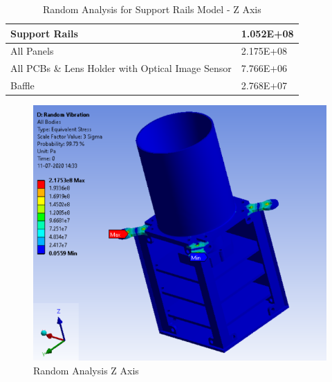 \documentclass[../../main.tex]{subfiles}
\begin{document}
\begin{enumerate}
\begin{enumerate}
\begin{enumerate}
\begin{itemize}
\begin{table}[h!]
\begin{tabular}{|p{8cm}|p{5cm}|}
                        Support Rails & 1.052E+08 \\
                        \hline
                        All Panels & 2.175E+08 \\
                        \hline
                        All PCBs \& Lens Holder with Optical Image Sensor & 7.766E+06 \\
                        \hline
                        Baffle & 2.768E+07 \\
                        \hline
                        \end{tabular}
                        \caption{Random Analysis for Support Rails Model - Z Axis}
                        \label{tab:my_label}
                    \end{table}
                    \begin{figure}[H]
                        \centering
                        \includegraphics[scale=0.9]{Figures/Mechanical/Random_Z.PNG}
                        \caption{ Random Analysis Z Axis}
                        \label{fig:sys_CAD}
                    \end{figure}
                \end{itemize}
            \end{enumerate} 
        \end{enumerate}
    \end{enumerate}

\end{document}
